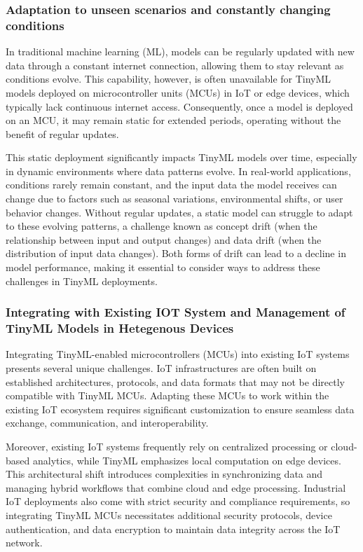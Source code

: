 \documentclass[twocolumn]{article}
\begin{document}
\subsubsection{Adaptation to unseen scenarios and constantly changing conditions}
In traditional machine learning (ML), models can be regularly updated with new data through a constant internet connection, allowing them to stay relevant as conditions evolve. This capability, however, is often unavailable for TinyML models deployed on microcontroller units (MCUs) in IoT or edge devices, which typically lack continuous internet access. Consequently, once a model is deployed on an MCU, it may remain static for extended periods, operating without the benefit of regular updates.

This static deployment significantly impacts TinyML models over time, especially in dynamic environments where data patterns evolve. In real-world applications, conditions rarely remain constant, and the input data the model receives can change due to factors such as seasonal variations, environmental shifts, or user behavior changes. Without regular updates, a static model can struggle to adapt to these evolving patterns, a challenge known as concept drift (when the relationship between input and output changes) and data drift (when the distribution of input data changes). Both forms of drift can lead to a decline in model performance, making it essential to consider ways to address these challenges in TinyML deployments.

\subsubsection{Integrating with Existing IOT System and Management of TinyML Models in Hetegenous Devices}
Integrating TinyML-enabled microcontrollers (MCUs) into existing IoT systems presents several unique challenges. IoT infrastructures are often built on established architectures, protocols, and data formats that may not be directly compatible with TinyML MCUs. Adapting these MCUs to work within the existing IoT ecosystem requires significant customization to ensure seamless data exchange, communication, and interoperability.

Moreover, existing IoT systems frequently rely on centralized processing or cloud-based analytics, while TinyML emphasizes local computation on edge devices. This architectural shift introduces complexities in synchronizing data and managing hybrid workflows that combine cloud and edge processing. Industrial IoT deployments also come with strict security and compliance requirements, so integrating TinyML MCUs necessitates additional security protocols, device authentication, and data encryption to maintain data integrity across the IoT network.
\end{document}
